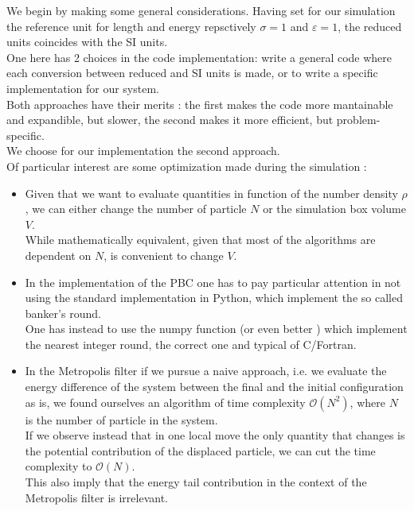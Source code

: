 We begin by making some general considerations. Having set for our simulation the reference unit for length and energy repsctively $\sigma = 1$ and $\varepsilon = 1$, the reduced units coincides with the SI units. \\
One here has 2 choices in the code implementation: write a general code where each conversion between reduced and SI units is made, or to write a specific implementation for our system. \\
Both approaches have their merits : the first makes the code more mantainable and expandible, but slower, the second makes it more efficient, but problem-specific. \\
We choose for our implementation the second approach. \\

Of particular interest are some optimization made during the simulation :
\begin{itemize}
    \item Given that we want to evaluate quantities in function of the number density $\rho$, we can either change the number of particle $N$ or the simulation box volume $V$. \\ 
    While mathematically equivalent, given that most of the algorithms are dependent on $N$, is convenient to change $V$.
    \item In the implementation of the PBC one has to pay particular attention in not using the standard  implementation in Python, which implement the so called banker's round.\\
    One has instead to use the numpy function  (or even better ) which implement the nearest integer round, the correct one and typical of C/Fortran.
    \item In the Metropolis filter if we pursue a naive approach, i.e. we evaluate the energy difference of the system between the final and the initial configuration as is, we found ourselves an algorithm of time 
    complexity $\mathcal{O}(N^2)$, where $N$ is the number of particle in the system. \\
    If we observe instead that in one local move the only quantity that changes is the potential contribution of the displaced particle, we can cut the time complexity to $\mathcal{O}(N)$. \\
    This also imply that the energy tail contribution in the context of the Metropolis filter is irrelevant.
\end{itemize}



